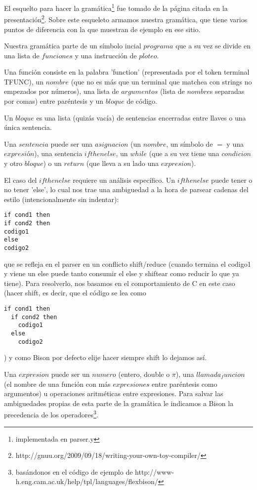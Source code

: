 El esquelto para hacer la gramática\footnote{implementada en parser.y} fue tomado de la página citada en la presentación\footnote{http://gnuu.org/2009/09/18/writing-your-own-toy-compiler/}. Sobre este esqueleto armamos nuestra gramática, que tiene varios puntos de diferencia con la que muestran de ejemplo en ese sitio.

Nuestra gramática parte de un símbolo incial $programa$ que a su vez se divide en una lista de $funciones$ y una instrucción de $ploteo$.

Una función consiste en la palabra 'function' (representada por el token terminal TFUNC), un $nombre$ (que no es más que un terminal que matchea con strings no empezados por números), una lista de $argumentos$ (lista de $nombre$s separadas por comas) entre paréntesis y un $bloque$ de código.

Un $bloque$ es una lista (quizás vacía) de sentencias encerradas entre llaves o una única sentencia.

Una $sentencia$ puede ser una $asignacion$ (un $nombre$, un símbolo de $=$ y una $expresión$), una sentencia $ifthenelse$, un $while$ (que a su vez tiene una $condicion$ y otro $bloque$) o un $return$ (que lleva a su lado una $expresion$).

El caso del $ifthenelse$ requiere un análisis específico. Un $ifthenelse$ puede tener o no tener 'else', lo cual nos trae una ambiguedad a la hora de parsear cadenas del estilo (intencionalmente sin indentar):
\begin{verbatim}
if cond1 then
if cond2 then
codigo1
else
codigo2
\end{verbatim}
que se refleja en el parser en un conflicto shift/reduce (cuando termina el codigo1 y viene un else puede tanto consumir el else y shiftear como reducir lo que ya tiene).
Para resolverlo, nos basamos en el comportamiento de C en este caso (hacer shift, es decir, que el código se lea como
\begin{verbatim}
if cond1 then
  if cond2 then
    codigo1
  else
    codigo2
\end{verbatim}
) y como Bison por defecto elije hacer siempre shift lo dejamos así.

Una $expresion$ puede ser un $numero$ (entero, double o $\pi$), una $llamada_funcion$ (el nombre de una función con más $expresiones$ entre paréntesis como argumentos) u operaciones aritméticas entre expresiones. Para salvar las ambiguedades propias de esta parte de la gramática le indicamos a Bison la precedencia de los operadores\footnote{basándonos en el código de ejemplo de http://www-h.eng.cam.ac.uk/help/tpl/languages/flexbison/}.

